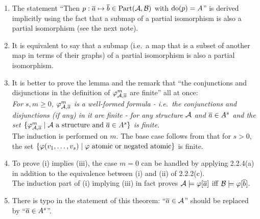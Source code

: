 \begin{enumerate}[1.]
%
\item {} The statement ``Then $p : \overline{a} \mapsto \overline{b} \in {\mathrm{Part}(\mathcal{A}, \mathcal{B})}$ with ${\mathrm{do}({p})} = A$'' is derived implicitly using the fact that a submap of a partial isomorphism is also a partial isomorphism (see the next note).
%
\item {} It is equivalent to say that a submap (i.e.\ a map that is a subset of another map in terms of their graphs) of a partial isomorphism is also a partial isomorphism.
%
\item {} It is better to prove the lemma and the remark that ``the conjunctions and disjunctions in the definition of $\varphi^{m}_{\mathcal{A}, \overline{a}}$ are finite'' all at once:
\medskip\\
\emph{For $s, m \geq 0$, $\varphi^{m}_{\mathcal{A}, \overline{a}}$ is a well-formed formula - i.e.\ the conjunctions and disjunctions (if any) in it are finite - for any structure $\mathcal{A}$ and $\overline{a} \in A^{s}$ and the set $\sett{\ityp{m}{\strct{A}, \vect{a}}}{\begin{math}\strct{A}\end{math} a structure and \begin{math}\vect{a} \in \cartpwr{A}{s}\end{math}}$ is finite.}
\medskip\\
The induction is performed on $m$. The base case follows from that for $s > 0$, the set $\sett{\varphi(\seq{v}{s})}{\begin{math}\varphi\end{math} atomic or negated atomic}$ is finite.
%
\item {} To prove (i) implies (iii), the case $m = 0$ can be handled by applying 2.2.4(a) in addition to the equivalence between (i) and (ii) of 2.2.2(c).
\medskip\\
The induction part of (i) implying (iii) in fact proves $\mathcal{A} \models \varphi[\overline{a}]$ iff $\mathcal{B} \models \varphi[\overline{b}]$.
%
\item {} There is typo in the statement of this theorem: ``$\overline{a} \in \mathcal{A}$'' should be replaced by ``$\overline{a} \in A^{s}$''.
%
\end{enumerate}


